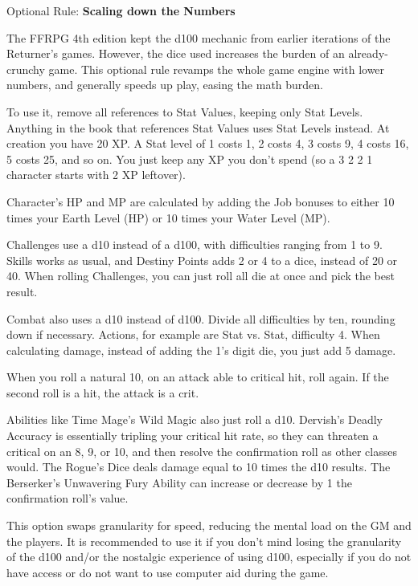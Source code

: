 \begin{multiboco}
Optional Rule: \textbf{Scaling down the Numbers}\label{optrule:scaling}

The FFRPG 4th edition kept the d100 mechanic from earlier iterations of the Returner’s games. However, the dice used increases the burden of an already-crunchy game. This optional rule revamps the whole game engine with lower numbers, and generally speeds up play, easing the math burden.

To use it, remove all references to Stat Values, keeping only Stat Levels. Anything in the book that references Stat Values uses Stat Levels instead. At creation you have 20 XP\@. A Stat level of 1 costs 1, 2 costs 4, 3 costs 9, 4 costs 16, 5 costs 25, and so on. You just keep any XP you don't spend (so a 3 2 2 1 character starts with 2 XP leftover).

Character’s HP and MP are calculated by adding the Job bonuses to either 10 times your Earth Level (HP) or 10 times your Water Level (MP).

Challenges use a d10 instead of a d100, with difficulties ranging from 1 to 9. Skills works as usual, and Destiny Points adds 2 or 4 to a dice, instead of 20 or 40. When rolling Challenges, you can just roll all die at once and pick the best result.

Combat also uses a d10 instead of d100. Divide all difficulties by ten, rounding down if necessary.  Actions, for example are Stat vs. Stat, difficulty 4. When calculating damage, instead of adding the 1's digit die, you just add 5 damage.

When you roll a natural 10, on an attack able to critical hit, roll again. If the second roll is a hit, the attack is a crit.

Abilities like Time Mage’s Wild Magic also just roll a d10. Dervish's Deadly Accuracy is essentially tripling your critical hit rate, so they can threaten a critical on an 8, 9, or 10, and then resolve the confirmation roll as other classes would. The Rogue’s Dice deals damage equal to 10 times the d10 results. The Berserker’s Unwavering Fury Ability can increase or decrease by 1 the confirmation roll’s value.

This option swaps granularity for speed, reducing the mental load on the GM and the players. It is recommended to use it if you don’t mind losing the granularity of the d100 and/or the nostalgic experience of using d100, especially if you do not have access or do not want to use computer aid during the game.
\end{multiboco}